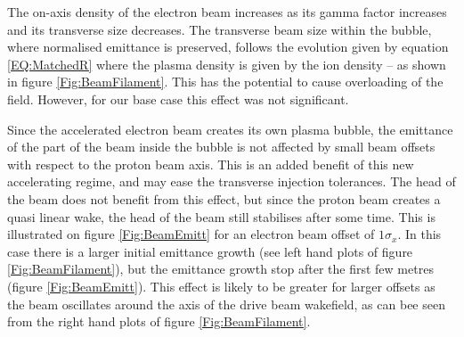 \documentclass[aps,prstab,reprint,amsmath,amssymb,groupedaddress]{revtex4-1}
\begin{document}
The on-axis density of the electron beam increases as its gamma factor increases and its transverse size decreases. The
transverse beam size within the bubble, where normalised emittance is preserved, follows the evolution given by equation
\ref{EQ:MatchedR} where the plasma density is given by the ion density -- as shown in figure \ref{Fig:BeamFilament}.
This has the potential to cause overloading of the field. However, for our base case this effect was not significant.



Since the accelerated electron beam creates its own plasma bubble, the emittance of the part of the beam inside the
bubble is not affected by small beam offsets with respect to the proton beam axis. This is an added benefit of this new
accelerating regime, and may ease the transverse injection tolerances. The head of the beam does not benefit from this
effect, but since the proton beam creates a quasi linear wake, the head of the beam still stabilises after some time.
This is illustrated on figure \ref{Fig:BeamEmitt} for an electron beam offset of $1\sigma_{x}$. In this case there is a
larger initial emittance growth (see left hand plots of figure \ref{Fig:BeamFilament}), but the emittance growth stop
after the first few metres (figure \ref{Fig:BeamEmitt}). This effect is likely to be greater for larger offsets as the
beam oscillates around the axis of the drive beam wakefield, as can bee seen from the right hand plots of figure
\ref{Fig:BeamFilament}.
\end{document}
